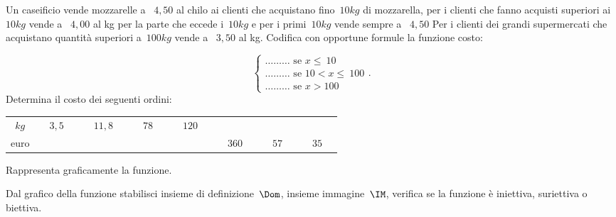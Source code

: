 \begin{esercizio}
\label{ese:D.63}
Un caseificio vende mozzarelle a \officialeuro\ \(4,50\) al chilo ai clienti che 
acquistano fino~\(10\unit{kg}\) di mozzarella, per i clienti che
fanno acquisti superiori ai~\(10\unit{kg}\) vende a \officialeuro\ \(4,00\) al kg 
per la parte che eccede i~\(10\unit{kg}\) e per i primi~\(10\unit{kg}\)
vende sempre a \officialeuro\ \(4,50\) Per i clienti dei grandi supermercati che 
acquistano quantità superiori a~\(100\unit{kg}\) vende a \officialeuro\ \(3,50\)
al kg. Codifica con opportune formule la funzione costo:

\[\left\{\begin{array}{l}
\ldots\ldots\ldots \text{ se } x \le~10\\
\ldots\ldots\ldots \text{ se } 10< x \le~100\\
\ldots\ldots\ldots \text{ se } x > 100\end{array}\right..
\]
Determina il costo dei seguenti ordini:
\begin{center}
 \begin{tabular}{cccccccc}
  \toprule
  \(\unit{kg}\) & \( \quad 3,5 \quad \) & \( \quad 11,8 \quad \) & \( \quad 78 \quad \) 
& \( \quad 120 
\quad \) & & &\\
  euro& & & & & \( \quad 360 \quad \) & \( \quad 57 \quad \) & \( \quad 35 \quad \)\\
  \bottomrule
 \end{tabular}
\end{center}

Rappresenta graficamente la funzione.
\end{esercizio}

\begin{esercizio}
\label{ese:D.64}
Dal grafico della funzione stabilisci insieme di definizione~\(\Dom\), insieme 
immagine~\(\IM\), verifica se la funzione è iniettiva, suriettiva o biettiva.
\begin{center}
 
\end{center}

\end{esercizio}

